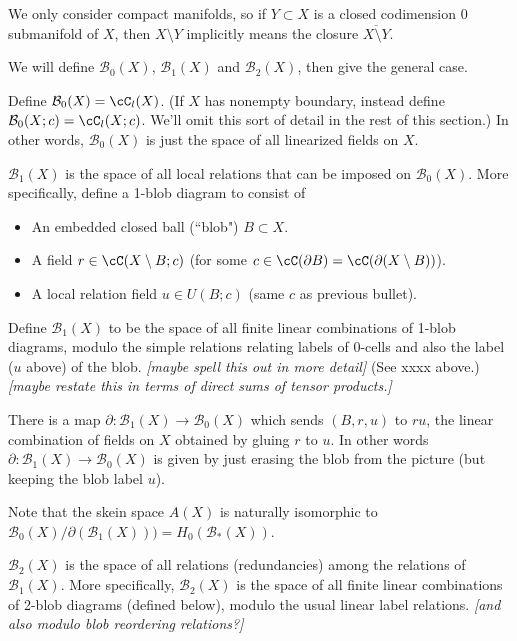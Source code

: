 \documentclass[11pt,leqno]{amsart}
\def\bc{{\mathcal B}}
\def\bd{\partial}
\def\sub{\subset}
\def\setmin{\setminus}
\def\nn#1{{{\it \small [#1]}}}
\begin{document}
We only consider compact manifolds, so if $Y \sub X$ is a closed codimension 0
submanifold of $X$, then $X \setmin Y$ implicitly means the closure
$\overline{X \setmin Y}$.

We will define $\bc_0(X)$, $\bc_1(X)$ and $\bc_2(X)$, then give the general case.

Define $\bc_0(X) = \cC_l(X)$.
(If $X$ has nonempty boundary, instead define $\bc_0(X; c) = \cC_l(X; c)$.
We'll omit this sort of detail in the rest of this section.)
In other words, $\bc_0(X)$ is just the space of all linearized fields on $X$.

$\bc_1(X)$ is the space of all local relations that can be imposed on $\bc_0(X)$.
More specifically, define a 1-blob diagram to consist of
\begin{itemize}
\item An embedded closed ball (``blob") $B \sub X$.
\item A field $r \in \cC(X \setmin B; c)$
(for some $c \in \cC(\bd B) = \cC(\bd(X \setmin B))$).
\item A local relation field $u \in U(B; c)$
(same $c$ as previous bullet).
\end{itemize}
Define $\bc_1(X)$ to be the space of all finite linear combinations of
1-blob diagrams, modulo the simple relations relating labels of 0-cells and
also the label ($u$ above) of the blob.
\nn{maybe spell this out in more detail}
(See xxxx above.)
\nn{maybe restate this in terms of direct sums of tensor products.}

There is a map $\bd : \bc_1(X) \to \bc_0(X)$ which sends $(B, r, u)$ to $ru$, the linear
combination of fields on $X$ obtained by gluing $r$ to $u$.
In other words $\bd : \bc_1(X) \to \bc_0(X)$ is given by
just erasing the blob from the picture
(but keeping the blob label $u$).

Note that the skein space $A(X)$
is naturally isomorphic to $\bc_0(X)/\bd(\bc_1(X))) = H_0(\bc_*(X))$.

$\bc_2(X)$ is the space of all relations (redundancies) among the relations of $\bc_1(X)$.
More specifically, $\bc_2(X)$ is the space of all finite linear combinations of
2-blob diagrams (defined below), modulo the usual linear label relations.
\nn{and also modulo blob reordering relations?}
\end{document}
